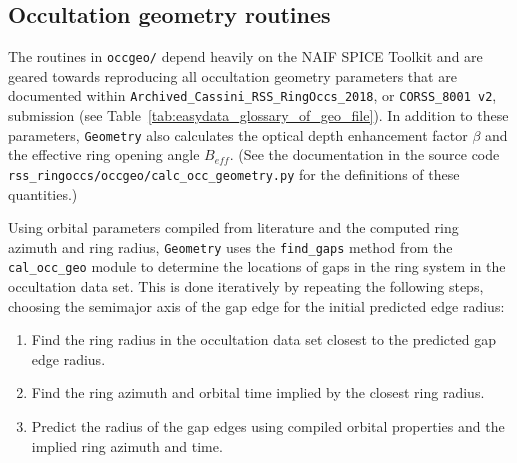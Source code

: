 \documentclass[titlepage, 12pt]{article}
\begin{document}
        \subsection{Occultation geometry routines}
            The routines in \texttt{occgeo/} depend heavily on the
            NAIF SPICE Toolkit and are geared towards reproducing
            all occultation geometry parameters that are documented within
            \texttt{Archived\_Cassini\_RSS\_RingOccs\_2018},
            or \texttt{CORSS\_8001 v2}, submission
            (see Table~\ref{tab:easydata_glossary_of_geo_file}).
            In addition to these parameters, \texttt{Geometry}
            also calculates %
            the optical depth enhancement
            factor $\beta$ and the effective ring opening angle $B_{eff}$. (See the documentation in the source code \texttt{rss\_ringoccs/occgeo/calc\_occ\_geometry.py} for the definitions of these quantities.)
            \par\hfill\par
            Using orbital parameters compiled from literature and the computed
            ring azimuth and ring radius, \texttt{Geometry} uses the
            \texttt{find\_gaps} method from the \texttt{cal\_occ\_geo} module
            to determine the locations of gaps in the ring system in the
            occultation data set. This is done iteratively by repeating the
            following steps, choosing the semimajor axis of the gap edge for
            the initial predicted edge radius:
            \begin{enumerate}
                \item Find the ring radius in the occultation data set
                      closest to the predicted gap edge radius.
                \item Find the ring azimuth and orbital time implied by
                      the closest ring radius.
                \item Predict the radius of the gap edges using compiled
                      orbital properties and the implied ring azimuth and time.
            \end{enumerate}
\end{document}
